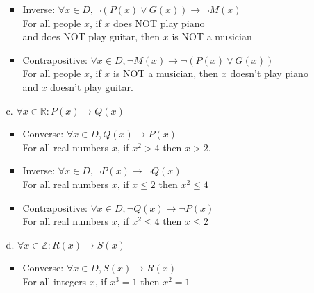 \begin{enumerate}
\begin{itemize}
\begin{itemize}
                        \item Inverse:
                                $\forall x \in D, \neg (P(x) \lor G(x)) \to \neg M(x)$      \\
                                For all people $x$, if $x$ does NOT play piano \\
                                and does NOT play guitar,
                                then $x$ is NOT a musician     
                        
                        \item Contrapositive:
                                $\forall x \in D, \neg M(x) \to \neg (P(x) \lor G(x))$      \\
                                For all people $x$, if $x$ is NOT a musician,
                                then $x$ doesn't play piano and $x$ doesn't play guitar.
                             
                    \end{itemize}
            \item[c.] $\forall x \in \mathbb{R}: P(x) \to Q(x)$
                    \begin{itemize}
                        \item Converse:
                                $\forall x \in D, Q(x) \to P(x)$      \\
                                For all real numbers $x$, if $x^{2} > 4$ then $x > 2$.     
                        
                        \item Inverse:
                                $\forall x \in D, \neg P(x) \to \neg Q(x)$      \\
                                For all real numbers $x$, if $x \leq 2$ then $x^{2} \leq 4$     
                        
                        \item Contrapositive:
                                $\forall x \in D, \neg Q(x) \to \neg P(x)$      \\
                                For all real numbers $x$, if $x^{2} \leq 4$ then $x \leq 2$     
                    \end{itemize}
            \item[d.] $\forall x \in \mathbb{Z}: R(x) \to S(x)$
                    \begin{itemize}
                        \item Converse:
                                $\forall x \in D, S(x) \to R(x)$      \\
                                For all integers $x$, if $x^{3} = 1$ then $x^{2} = 1$     
                        

\end{itemize}
\end{itemize}
\end{enumerate}
